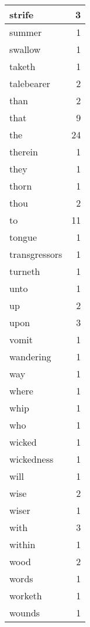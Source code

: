 \begin{center}
\begin{longtable}{l|r}
strife & 3\\ \hline 
summer & 1\\ \hline 
swallow & 1\\ \hline 
taketh & 1\\ \hline 
talebearer & 2\\ \hline 
than & 2\\ \hline 
that & 9\\ \hline 
the & 24\\ \hline 
therein & 1\\ \hline 
they & 1\\ \hline 
thorn & 1\\ \hline 
thou & 2\\ \hline 
to & 11\\ \hline 
tongue & 1\\ \hline 
transgressors & 1\\ \hline 
turneth & 1\\ \hline 
unto & 1\\ \hline 
up & 2\\ \hline 
upon & 3\\ \hline 
vomit & 1\\ \hline 
wandering & 1\\ \hline 
way & 1\\ \hline 
where & 1\\ \hline 
whip & 1\\ \hline 
who & 1\\ \hline 
wicked & 1\\ \hline 
wickedness & 1\\ \hline 
will & 1\\ \hline 
wise & 2\\ \hline 
wiser & 1\\ \hline 
with & 3\\ \hline 
within & 1\\ \hline 
wood & 2\\ \hline 
words & 1\\ \hline 
worketh & 1\\ \hline 
wounds & 1\\ \hline 
\end{longtable}  
\end{center}  


  
\normalsize  

  
  
